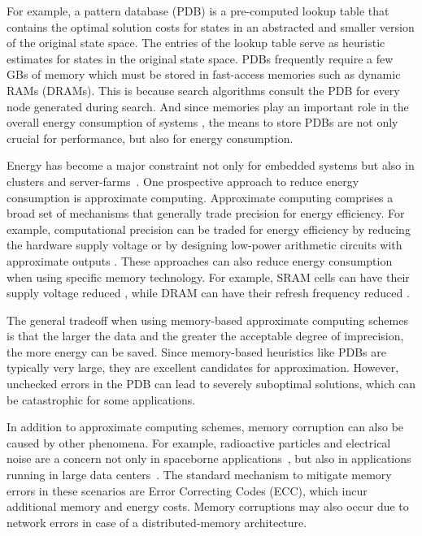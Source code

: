 \documentclass[letterpaper]{article}
\begin{document}
For example, a pattern database (PDB) is a pre-computed lookup table that contains the optimal solution costs for states in an abstracted and smaller version of the original state space. The entries of the lookup table serve as heuristic estimates for states in the original state space.
PDBs frequently require a few GBs of memory which must be stored in fast-access memories such as dynamic RAMs (DRAMs). This is because search algorithms consult the PDB for every node generated during search. And since memories play an important role in the overall energy consumption of systems \cite{5695550}, the means to store PDBs are not only crucial for performance, but also for energy consumption.

Energy has become a major constraint not only for embedded systems but also in clusters and server-farms~\cite{Cameron2005}. One prospective approach to reduce energy consumption is approximate computing. Approximate computing comprises a broad set of mechanisms that generally trade precision for energy efficiency. For example, computational precision can be traded for energy efficiency by reducing the hardware supply voltage
\cite{974895} or by designing low-power arithmetic circuits with approximate outputs \cite{5993675}. These approaches can also reduce energy consumption when using specific memory technology. For example, SRAM cells can have their supply voltage reduced \cite{5686921}, while DRAM can have their refresh frequency reduced \cite{Liu:2011:FSD:1950365.1950391}. %

The general tradeoff when using memory-based approximate computing schemes is that the larger the data and the greater the acceptable degree of imprecision, the more energy can be saved. Since memory-based heuristics like PDBs are typically very large, they are excellent candidates for approximation. However, unchecked errors in the PDB can lead to severely suboptimal solutions, which can be catastrophic for some applications. %

In addition to approximate computing schemes, memory corruption can also be caused by other phenomena.
For example, radioactive particles and electrical noise are a concern not only in spaceborne applications~\cite{Wagstaff_kmeansin}, but also in applications running in large data centers~\cite{7266869}. The standard mechanism to mitigate memory errors in these scenarios are Error Correcting Codes (ECC), which incur additional memory and energy costs. %
Memory corruptions may also occur due to network errors in case of a distributed-memory architecture.
\end{document}
